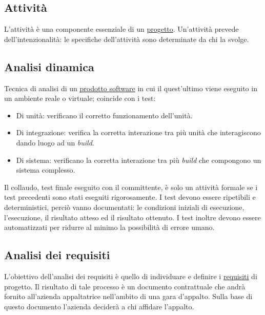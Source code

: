 





\copertina


\tableofcontents

\newpage
	\subsection{Attività}
	\label{sec:attivita}
	L'attività è una componente essenziale di un \underline{\hyperref[sec:progetto]{progetto}}. Un'attività prevede dell'intenzionalità: le specifiche dell'attività sono determinate da chi la svolge. 	
	
	\subsection{Analisi dinamica}
	\label{sec:analisidinamica}
	Tecnica di analisi di un \underline{\hyperref[sec:prodottosoftware]prodotto {software}} in cui il quest'ultimo viene eseguito in un ambiente reale o virtuale; coincide con i test: 
	\begin{itemize}  
		\item Di unità: verificano il corretto funzionamento dell'unità.
		\item Di integrazione: verifica la corretta interazione tra più unità che interagiscono dando luogo ad un \emph{build}.
		\item Di sistema: verificano la corretta interazione tra più \emph{build} che compongono un sistema complesso.
	\end{itemize}	
	Il collaudo, test finale eseguito con il committente, è solo un attività formale se i test precedenti sono stati eseguiti rigorosamente. I test devono essere ripetibili e deterministici, perciò vanno documentati: le condizioni iniziali di esecuzione, l'esecuzione, il risultato atteso ed il risultato ottenuto. I test inoltre devono essere automatizzati per ridurre al minimo la possibilità di errore umano.
	
	\subsection{Analisi dei requisiti}
	\label{sec:analisirequisiti}
	L'obiettivo dell'analisi dei requisiti è quello di individuare e definire i \underline{\hyperref[sec:requisito]{requisiti}} di progetto. Il risultato di tale processo è un documento contrattuale che andrà fornito all'azienda appaltatrice nell'ambito di una gara d'appalto. Sulla base di questo documento l'azienda deciderà a chi affidare l'appalto.
	
